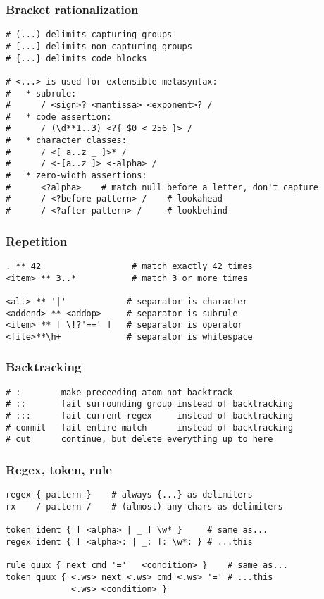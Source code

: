 \documentclass{beamer}
\begin{document}
\begin{frame}[fragile]
\frametitle{Bracket rationalization}
\begin{verbatim}
# (...) delimits capturing groups
# [...] delimits non-capturing groups
# {...} delimits code blocks

# <...> is used for extensible metasyntax:
#   * subrule:
#      / <sign>? <mantissa> <exponent>? /
#   * code assertion:
#      / (\d**1..3) <?{ $0 < 256 }> /
#   * character classes:
#      / <[ a..z _ ]>* /
#      / <-[a..z_]> <-alpha> /
#   * zero-width assertions:
#      <?alpha>    # match null before a letter, don't capture
#      / <?before pattern> /    # lookahead
#      / <?after pattern> /     # lookbehind
\end{verbatim}
\end{frame}

\begin{frame}[fragile]
\frametitle{Repetition}
\begin{verbatim}
. ** 42                  # match exactly 42 times
<item> ** 3..*           # match 3 or more times

<alt> ** '|'            # separator is character
<addend> ** <addop>     # separator is subrule
<item> ** [ \!?'==' ]   # separator is operator
<file>**\h+             # separator is whitespace
\end{verbatim}
\end{frame}

\begin{frame}[fragile]
\frametitle{Backtracking}
\begin{verbatim}
# :        make preceeding atom not backtrack
# ::       fail surrounding group instead of backtracking
# :::      fail current regex     instead of backtracking
# commit   fail entire match      instead of backtracking
# cut      continue, but delete everything up to here
\end{verbatim}
\end{frame}

\begin{frame}[fragile]
\frametitle{Regex, token, rule}
\begin{verbatim}
regex { pattern }    # always {...} as delimiters
rx    / pattern /    # (almost) any chars as delimiters

token ident { [ <alpha> | _ ] \w* }     # same as...
regex ident { [ <alpha>: | _: ]: \w*: } # ...this

rule quux { next cmd '='   <condition> }    # same as...
token quux { <.ws> next <.ws> cmd <.ws> '=' # ...this
             <.ws> <condition> }
\end{verbatim}
\end{frame}
\end{document}
